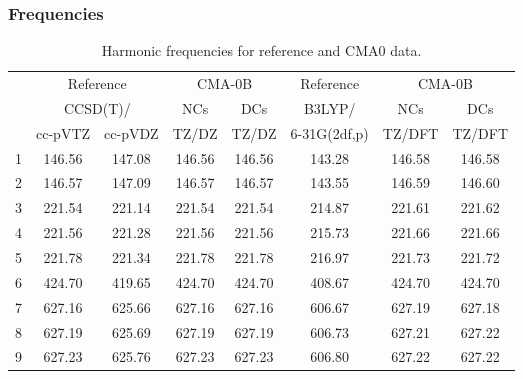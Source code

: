 \documentclass[10pt,oneside]{article}
\begin{document}
\subsubsection*{Frequencies}
\begin{table}[h!]
\centering
\caption{Harmonic frequencies for reference and CMA0 data.}
\begin{tabular}{cccccccc}
\toprule
{} & \multicolumn{2}{c}{Reference} & \multicolumn{2}{c}{CMA-0B} &    Reference & \multicolumn{2}{c}{CMA-0B} \\
{} & \multicolumn{2}{c}{CCSD(T)/} &    NCs &    DCs &       B3LYP/ &    NCs &    DCs \\
{} &   cc-pVTZ & cc-pVDZ &  TZ/DZ &  TZ/DZ & 6-31G(2df,p) & TZ/DFT & TZ/DFT \\
\midrule
1 &    146.56 &  147.08 & 146.56 & 146.56 &       143.28 & 146.58 & 146.58 \\
2 &    146.57 &  147.09 & 146.57 & 146.57 &       143.55 & 146.59 & 146.60 \\
3 &    221.54 &  221.14 & 221.54 & 221.54 &       214.87 & 221.61 & 221.62 \\
4 &    221.56 &  221.28 & 221.56 & 221.56 &       215.73 & 221.66 & 221.66 \\
5 &    221.78 &  221.34 & 221.78 & 221.78 &       216.97 & 221.73 & 221.72 \\
6 &    424.70 &  419.65 & 424.70 & 424.70 &       408.67 & 424.70 & 424.70 \\
7 &    627.16 &  625.66 & 627.16 & 627.16 &       606.67 & 627.19 & 627.18 \\
8 &    627.19 &  625.69 & 627.19 & 627.19 &       606.73 & 627.21 & 627.22 \\
9 &    627.23 &  625.76 & 627.23 & 627.23 &       606.80 & 627.22 & 627.22 \\
\bottomrule
\end{tabular}
\end{table}

\clearpage
\end{document}
